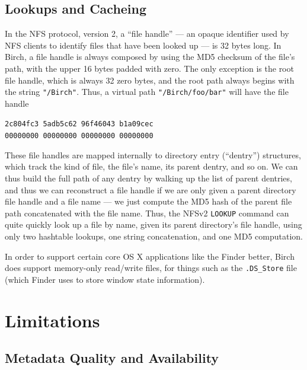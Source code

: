 \documentclass{article}
\begin{document}
\subsection{Lookups and Cacheing}

In the NFS protocol, version 2, a ``file handle'' --- an opaque
identifier used by NFS clients to identify files that have been looked
up --- is 32 bytes long. In Birch, a file handle is always composed by
using the MD5 \cite{RFC1321} checksum of the file's path, with the
upper 16 bytes padded with zero. The only exception is the root file
handle, which is always 32 zero bytes, and the root path always begins
with the string \texttt{"/Birch"}. Thus, a virtual path
\texttt{"/Birch/foo/bar"} will have the file handle

\begin{center}
  \texttt{2c804fc3 5adb5c62 96f46043 b1a09cec} \\
  \texttt{00000000 00000000 00000000 00000000}
\end{center}

\noindent These file handles are mapped internally to directory entry
(``dentry'') structures, which track the kind of file, the file's
name, its parent dentry, and so on. We can thus build the full path of
any dentry by walking up the list of parent dentries, and thus we can
reconstruct a file handle if we are only given a parent directory file
handle and a file name --- we just compute the MD5 hash of the parent
file path concatenated with the file name. Thus, the NFSv2
\texttt{LOOKUP} command can quite quickly look up a file by name,
given its parent directory's file handle, using only two hashtable
lookups, one string concatenation, and one MD5 computation.

In order to support certain core OS X applications like the Finder
better, Birch does support memory-only read/write files, for things
such as the \texttt{.DS\_Store} file (which Finder uses to store
window state information).

\section{Limitations}

\subsection{Metadata Quality and Availability}
\end{document}
